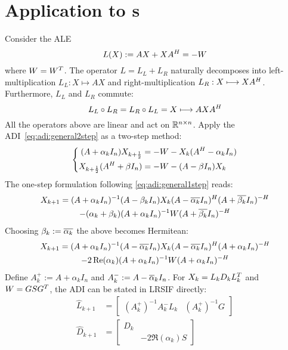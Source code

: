 \section{Application to s}
\label{sec:adi:ale}

Consider the \ac{ALE}
\begin{equation*}
\label{eq:adi:ale}
  L(X) := AX + XA^H = -W
\end{equation*}
where $W = W^T$.
The \Lyapunov operator $L = L_L + L_R$ naturally decomposes into
left-multiplication $L_L : X \mapsto AX$ and
right-multiplication $L_R : X \longmapsto XA^H$.
Furthermore, $L_L$ and $L_R$ commute:
\begin{equation*}
  L_L \circ L_R = L_R \circ L_L = X \longmapsto AXA^H
\end{equation*}
All the operators above are linear and act on $\mathbb{R}^{n\times n}$.
Apply the \ac{ADI}~\eqref{eq:adi:general2step} as a two-step method:
\begin{equation}
  \left\{
  \begin{aligned}
    (A + \alpha_k I_n) X_{k+\frac{1}{2}} &= -W - X_k (A^H - \alpha_k I_n) \\
    X_{k+\frac{1}{2}} (A^H + \beta I_n) &= -W - (A - \beta I_n) X_k
  \end{aligned}
  \right.
\end{equation}
The one-step formulation following \eqref{eq:adi:general1step} reads:
\begin{multline}
  X_{k+1} =
  (A + \alpha_k I_n)^{-1}
  (A - \beta_k I_n)
  X_k
  (A - \conj{\alpha_k} I_n)^\HT
  (A + \conj{\beta_k} I_n)^{-H}
  \\
  - (\alpha_k + \beta_k)
  (A + \alpha_k I_n)^{-1}
  W
  (A + \conj{\beta_k} I_n)^{-\HT}
\end{multline}
Choosing $\beta_k := \conj{\alpha_k}$
the above becomes Hermitean:
\begin{multline}
\label{eq:adi:ale1step}
  X_{k+1} =
  (A + \alpha_k I_n)^{-1}
  (A - \conj{\alpha_k} I_n)
  X_k
  (A - \conj{\alpha_k} I_n)^\HT
  (A + \alpha_k I_n)^{-H}
  \\
  - 2\Re(\alpha_k)
  (A + \alpha_k I_n)^{-1}
  W
  (A + \alpha_k I_n)^{-\HT}
\end{multline}
Define
$A^+_k := A + \alpha_k I_n$ and
$A^-_k := A - \conj\alpha_k I_n$.
For $X_k = L_k D_k L_k^T$ and $W = GSG^T$,
the \ac{ADI} can be stated in \ac{LRSIF} directly:
\begin{align*}
  \hat L_{k+1} &= \begin{bmatrix}
    (A^+_k)^{-1} A^-_k L_k &
    (A^+_k)^{-1} G
  \end{bmatrix} \\
  \hat D_{k+1} &= \begin{bmatrix}
    D_k \\
    & -2\Re(\alpha_k) S
  \end{bmatrix}
\end{align*}

